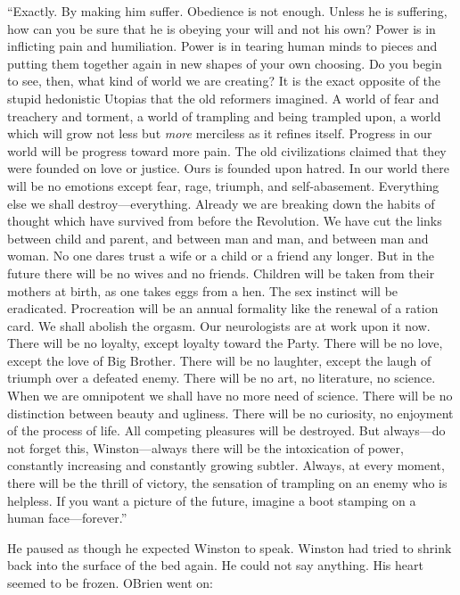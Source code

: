``Exactly. By making him suffer. Obedience is not enough. Unless he is
suffering, how can you be sure that he is obeying your will and not his
own? Power is in inflicting pain and humiliation. Power is in tearing
human minds to pieces and putting them together again in new shapes of
your own choosing. Do you begin to see, then, what kind of world we are
creating? It is the exact opposite of the stupid hedonistic Utopias that
the old reformers imagined. A world of fear and treachery and torment, a
world of trampling and being trampled upon, a world which will grow not
less but \emph{more} merciless as it refines itself. Progress in our
world will be progress toward more pain. The old civilizations claimed
that they were founded on love or justice. Ours is founded upon hatred.
In our world there will be no emotions except fear, rage, triumph, and
self-abasement. Everything else we shall destroy---everything. Already
we are breaking down the habits of thought which have survived from
before the Revolution. We have cut the links between child and parent,
and between man and man, and between man and woman. No one dares trust a
wife or a child or a friend any longer. But in the future there will be
no wives and no friends. Children will be taken from their mothers at
birth, as one takes eggs from a hen. The sex instinct will be
eradicated. Procreation will be an annual formality like the renewal of
a ration card. We shall abolish the orgasm. Our neurologists are at work
upon it now. There will be no loyalty, except loyalty toward the Party.
There will be no love, except the love of Big Brother. There will be no
laughter, except the laugh of triumph over a defeated enemy. There will
be no art, no literature, no science. When we are omnipotent we shall
have no more need of science. There will be no distinction between
beauty and ugliness. There will be no curiosity, no enjoyment of the
process of life. All competing pleasures will be destroyed. But
always---do not forget this, Winston---always there will be the
intoxication of power, constantly increasing and constantly growing
subtler. Always, at every moment, there will be the thrill of victory,
the sensation of trampling on an enemy who is helpless. If you want a
picture of the future, imagine a boot stamping on a human
face---forever.''

He paused as though he expected Winston to speak. Winston had tried to
shrink back into the surface of the bed again. He could not say
anything. His heart seemed to be frozen. O\textquotesingle Brien went
on:

